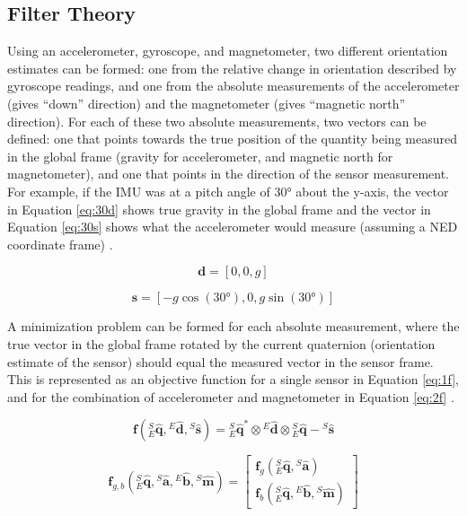 \documentclass[12pt,a4paper]{report}
\begin{document}
\subsection{Filter Theory} \label{ssec:4s4s2}
Using an accelerometer, gyroscope, and magnetometer, two different orientation estimates can be formed: one from the relative change in orientation described by gyroscope readings, and one from the absolute measurements of the accelerometer (gives “down” direction) and the magnetometer (gives “magnetic north” direction). For each of these two absolute measurements, two vectors can be defined: one that points towards the true position of the quantity being measured in the global frame (gravity for accelerometer, and magnetic north for magnetometer), and one that points in the direction of the sensor measurement. For example, if the IMU was at a pitch angle of 30° about the y-axis, the vector in Equation \ref{eq:30d} shows true gravity in the global frame and the vector in Equation \ref{eq:30s} shows what the accelerometer would measure (assuming a NED coordinate frame) \cite{madgwick}.

\begin{equation} \label{eq:30d}
	\mathbf{d}= [0, 0, g]
\end{equation}

\begin{equation} \label{eq:30s}
	\mathbf{s}= [-g \cos(30°), 0, g \sin(30°)]
\end{equation}

A minimization problem can be formed for each absolute measurement, where the true vector in the global frame rotated by the current quaternion (orientation estimate of the sensor) should equal the measured vector in the sensor frame. This is represented as an objective function for a single sensor in Equation \ref{eq:1f}, and for the combination of accelerometer and magnetometer in Equation \ref{eq:2f} \cite{madgwick}.

\begin{equation} \label{eq:1f}
	\mathbf{f}({}^S_E\hat{\mathbf{q}}, {}^E\hat{\mathbf{d}}, {}^S\hat{\mathbf{s}}) = {}^S_E\hat{\mathbf{q}}^* \otimes  {}^E\hat{\mathbf{d}} \otimes {}^S_E\hat{\mathbf{q}} - {}^S\hat{\mathbf{s}}
\end{equation}

\begin{equation} \label{eq:2f}
	\mathbf{f}_{g,b}({}^S_E\hat{\mathbf{q}}, {}^S\hat{\mathbf{a}}, {}^E\hat{\mathbf{b}}, {}^S\hat{\mathbf{m}}) = \begin{bmatrix}
		\mathbf{f}_g({}^S_E\hat{\mathbf{q}}, {}^S\hat{\mathbf{a}})\\
		\mathbf{f}_b({}^S_E\hat{\mathbf{q}}, {}^E\hat{\mathbf{b}}, {}^S\hat{\mathbf{m}})
	\end{bmatrix}
\end{equation}
\end{document}
